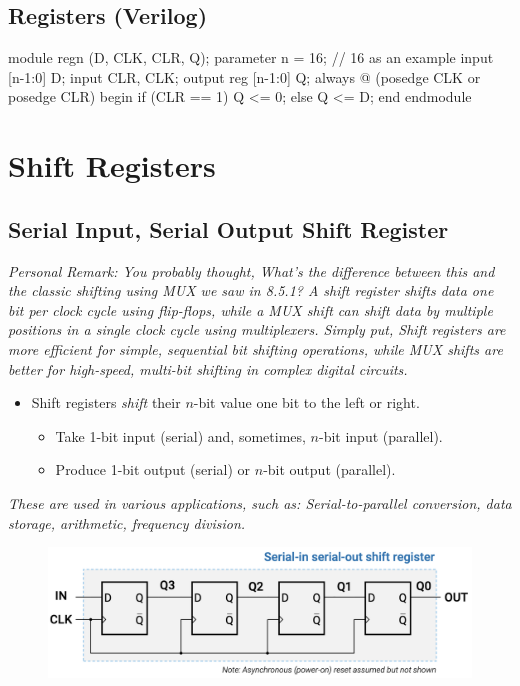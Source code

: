 \documentclass[12pt,openany]{book}
\begin{document}
\newpage 
\subsection{Registers (Verilog)}
\begin{vhdl}
module regn (D, CLK, CLR, Q);
parameter n = 16; // 16 as an example
input [n-1:0] D;
input CLR, CLK;
output reg [n-1:0] Q;
always @ (posedge CLK or posedge CLR)
	begin
		if (CLR == 1)
			Q <= 0;
	else
		Q <= D;
end
endmodule
\end{vhdl}

\section{Shift Registers}
\subsection{Serial Input, Serial Output Shift Register}
\textit{Personal Remark: You probably thought, What's the difference between this and the classic shifting using MUX we saw in 8.5.1? \newline A shift register shifts data one bit per clock cycle using flip-flops, while a MUX shift can shift data by multiple positions in a single clock cycle using multiplexers. Simply put, Shift registers are more efficient for simple, sequential bit shifting operations, while MUX shifts are better for high-speed, multi-bit shifting in complex digital circuits. }
\begin{itemize}
    \item[] Shift registers \textit{shift} their \(n\)-bit value one bit to the left or right.
    \begin{itemize}
        \item Take 1-bit input (serial) and, sometimes, \(n\)-bit input (parallel).
        \item Produce 1-bit output (serial) or \(n\)-bit output (parallel).
    \end{itemize}
\end{itemize}

\textit{These are used in various applications, such as: \newline Serial-to-parallel conversion, data storage, arithmetic, frequency division.}
\begin{figure}[h]
    \centering
    \includegraphics[width=1\textwidth]{circuits/14.1.2.png}
\end{figure}
\end{document}
